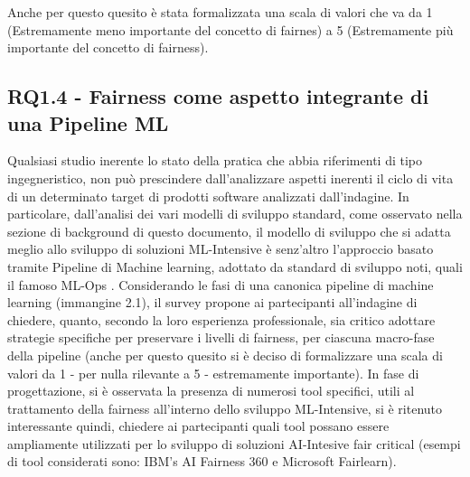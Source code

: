 	Anche per questo quesito è stata formalizzata una scala di valori che va da 1 (Estremamente meno importante del concetto di fairnes) a 5 (Estremamente più importante del concetto di fairness).\\
    
    \subsection{RQ1.4 - Fairness come aspetto integrante di una Pipeline ML}
    	\begin{center}
    	\hspace*{-5mm}%
    \end{center}
    
    Qualsiasi studio inerente lo stato della pratica che abbia riferimenti di tipo ingegneristico, non può prescindere dall'analizzare aspetti inerenti il ciclo di vita di un determinato target di prodotti software analizzati dall'indagine. In particolare, dall'analisi dei vari modelli di sviluppo standard, come osservato nella sezione di background di questo documento, il modello di sviluppo che si adatta meglio allo sviluppo di soluzioni ML-Intensive è senz'altro l'approccio basato tramite Pipeline di Machine learning, adottato da standard di sviluppo noti, quali il famoso ML-Ops \cite{MLOps}. Considerando le fasi di una canonica pipeline di machine learning (immangine 2.1), il survey propone ai partecipanti all'indagine di chiedere, quanto, secondo la loro esperienza professionale, sia critico adottare strategie specifiche per preservare i livelli di fairness, per ciascuna macro-fase della pipeline (anche per questo quesito si è deciso di formalizzare una scala di valori da 1 - per nulla rilevante a 5 - estremamente importante). In fase di progettazione, si è osservata la presenza di numerosi tool specifici, utili al trattamento della fairness all'interno dello sviluppo ML-Intensive, si è ritenuto interessante quindi, chiedere ai partecipanti quali tool possano essere ampliamente utilizzati per lo sviluppo di soluzioni AI-Intesive fair critical (esempi di tool considerati sono: IBM's AI Fairness 360 e Microsoft Fairlearn). \\
    

